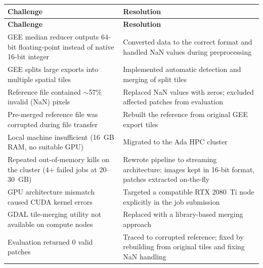 \documentclass[12pt,a4paper]{article}
\begin{document}
\begin{longtable}{p{}p{}}
\toprule
\textbf{Challenge} & \textbf{Resolution} \\
\midrule
\endfirsthead
\toprule
\textbf{Challenge} & \textbf{Resolution} \\
\midrule
\endhead
\bottomrule
\endlastfoot


GEE median reducer outputs 64-bit floating-point instead of native 16-bit integer & Converted data to the correct format and handled NaN values during preprocessing \\
\midrule
GEE splits large exports into multiple spatial tiles & Implemented automatic detection and merging of split tiles \\
\midrule
Reference file contained ${\sim}$57\% invalid (NaN) pixels & Replaced NaN values with zeros; excluded affected patches from evaluation \\
\midrule
Pre-merged reference file was corrupted during file transfer & Rebuilt the reference from original GEE export tiles \\
\midrule
Local machine insufficient (16~GB RAM, no suitable GPU) & Migrated to the Ada HPC cluster \\
\midrule
Repeated out-of-memory kills on the cluster (4+ failed jobs at 20--30~GB) & Rewrote pipeline to streaming architecture: images kept in 16-bit format, patches extracted on-the-fly \\
\midrule
GPU architecture mismatch caused CUDA kernel errors & Targeted a compatible RTX 2080~Ti node explicitly in the job submission \\
\midrule
GDAL tile-merging utility not available on compute nodes & Replaced with a library-based merging approach \\
\midrule
Evaluation returned 0 valid patches & Traced to corrupted reference; fixed by rebuilding from original tiles and fixing NaN handling \\


\end{longtable}
\end{document}

